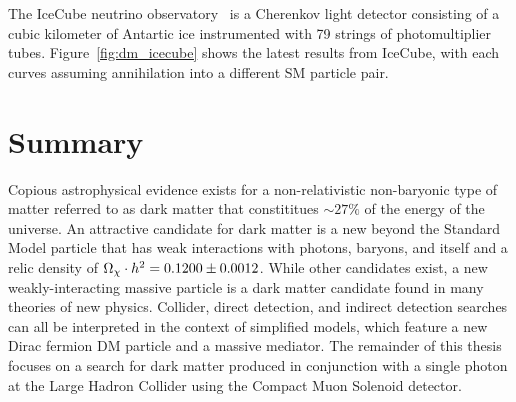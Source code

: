 The IceCube neutrino observatory~\cite{IceCube2016} is a Cherenkov light detector consisting of a cubic kilometer of Antartic ice instrumented with 79 strings of photomultiplier tubes.
Figure~\ref{fig:dm_icecube} shows the latest results from IceCube, with each curves assuming annihilation into a different SM particle pair.

\section{Summary}
Copious astrophysical evidence exists for a non-relativistic non-baryonic type of matter referred to as dark matter that constititues $\sim27\%$ of the energy of the universe.
An attractive candidate for dark matter is a new beyond the Standard Model particle that has weak interactions with photons, baryons, and itself and a relic density of $\Omega_\chi \cdot h^2 = 0.1200 \pm 0.0012$.
While other candidates exist, a new weakly-interacting massive particle is a dark matter candidate found in many theories of new physics.
Collider, direct detection, and indirect detection searches can all be interpreted in the context of simplified models, which feature a new Dirac fermion DM particle and a massive mediator.
The remainder of this thesis focuses on a search for dark matter produced in conjunction with a single photon at the Large Hadron Collider using the Compact Muon Solenoid detector.
